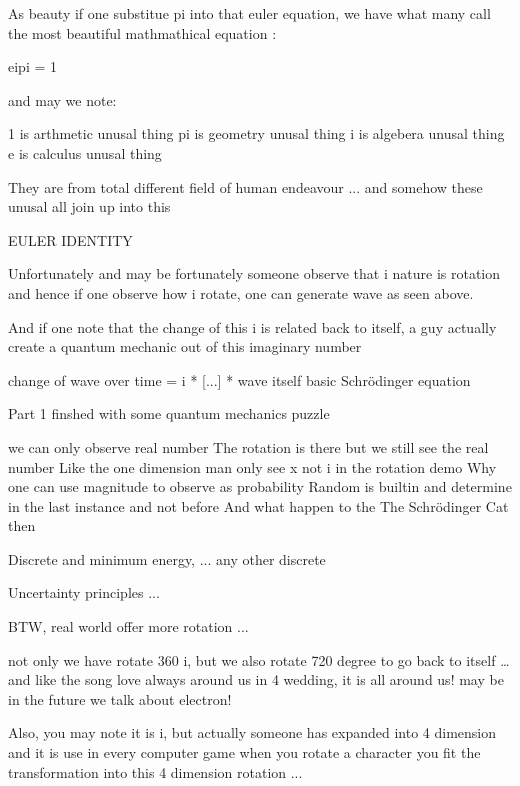\documentclass[letterpaper,10pt,english]{jupyterBook}
\begin{document}
\begin{sphinxVerbatim}[commandchars=\\\{\}]
As beauty if one substitue pi into that euler equation, 
we have what many call the most beautiful mathmathical equation :

e\PYGZca{}ipi = \PYGZhy{}1

and may we note:

\PYGZhy{}1 is arthmetic unusal thing
pi is geometry  unusal thing
i  is algebera  unusal thing
e  is calculus  unusal thing

They are from total different field of human endeavour ... 
and somehow these unusal all join up into this

EULER IDENTITY
\end{sphinxVerbatim}

\begin{sphinxVerbatim}[commandchars=\\\{\}]
Unfortunately and may be fortunately someone observe that i nature is rotation 
and hence if one observe how i rotate, one can generate wave as seen above. 

And if one note that the change of this i is related back to itself, 
a guy actually create a quantum mechanic out of this imaginary number

change of wave over time = i * [...] * wave itself \PYGZlt{}\PYGZhy{}\PYGZhy{} basic Schrödinger equation

\PYGZhy{}\PYGZhy{}\PYGZhy{}\PYGZhy{} Part 1 finshed with some quantum mechanics puzzle



we can only observe real number
    The rotation is there but we still see the real number
    Like the one dimension man only see x not i in the rotation demo
Why one can use magnitude to observe as probability
Random is built\PYGZhy{}in and determine in the last instance and not before
And what happen to the The Schrödinger Cat then

Discrete and minimum energy, ... any other discrete

Uncertainty principles ...
\end{sphinxVerbatim}

\begin{sphinxVerbatim}[commandchars=\\\{\}]
BTW, real world offer more rotation ... 

    not only we have rotate 360 i,
    but we also rotate 720 degree to go back to itself 
    … and like the song \PYGZdq{}love always around us\PYGZdq{} in 4 wedding, it is all around us!
    may be in the future we talk about electron!
    
Also, you may note it is i, but actually someone has expanded into 4 dimension 
    and it is use in every computer game
    when you rotate a character you fit the transformation into this 4 dimension rotation
    ... 
\end{sphinxVerbatim}
\end{document}
